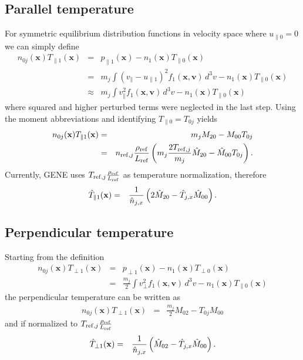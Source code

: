 \subsection{Parallel temperature}
For symmetric equilibrium distribution functions in velocity space where
$u_{\| 0} = 0$ we can simply define
\begin{eqnarray*}
n_{0j}(\mathbf{x}) T_{\| 1} (\mathbf{x}) &=& p_{\| 1}(\mathbf{x})
 -n_1(\mathbf{x})T_{\| 0}(\mathbf{x})\\
&=& m_j \int \left(v_\|-u_{\| 1}\right)^2 f_1(\mathbf{x},\mathbf{v})\,d^3v 
 -n_1(\mathbf{x})T_{\| 0}(\mathbf{x})\\
&\approx& m_j \int v_\|^2 f_1(\mathbf{x},\mathbf{v})\,d^3v 
 -n_1(\mathbf{x})T_{\| 0}(\mathbf{x})
\end{eqnarray*}
where squared and higher perturbed terms were neglected in the last step.
Using the moment abbreviations and identifying $T_{\| 0}=T_{0j}$ yields
\begin{eqnarray*}
n_{0j}(\mathbf{x}) T_{\| 1} (\mathbf{x}) &=& m_j M_{20} - M_{00}T_{0j}\\
&=& n_{\mathrm{ref},j} \frac{\rho_{\mathrm{ref}}}{L_{\mathrm{ref}}} \left(m_j \frac{2T_{\mathrm{ref},j}}{m_j} \hat{M}_{20}
    - \hat{M}_{00}T_{0j}\right).
\end{eqnarray*}
Currently, {\sc GENE} uses $T_{\mathrm{ref},j}\frac{\rho_{\mathrm{ref}}}{L_{\mathrm{ref}}}$ as temperature
normalization, therefore 
\begin{eqnarray*}
\hat{T}_{\| 1} (\mathbf{x}) &=& 
\frac{1}{\hat{n}_{j,x}} \left(2\hat{M}_{20}- \hat{T}_{j,x}\hat{M}_{00}\right).
\end{eqnarray*}

\subsection{Perpendicular temperature}
Starting from the definition
\begin{eqnarray*}
n_{0j}(\mathbf{x}) T_{\perp 1} (\mathbf{x}) &=& p_{\perp 1}(\mathbf{x})
 -n_1(\mathbf{x})T_{\perp 0}(\mathbf{x})\\
&=& \frac{m_j}{2} \int v_{\perp}^2 f_1(\mathbf{x},\mathbf{v})\,d^3v 
 -n_1(\mathbf{x})T_{\| 0}(\mathbf{x})
\end{eqnarray*}
the perpendicular temperature can be written as
\begin{eqnarray*}
n_{0j}(\mathbf{x}) T_{\perp 1} (\mathbf{x}) &=& \frac{m_j}{2} M_{02}-T_{0j} M_{00}
\end{eqnarray*}
and if normalized to $T_{\mathrm{ref},j}\frac{\rho_{\mathrm{ref}}}{L_{\mathrm{ref}}}$
\begin{eqnarray*}
\hat{T}_{\perp 1} (\mathbf{x}) &=& \frac{1}{\hat{n}_{j,x}} \left(\hat{M}_{02}-\hat{T}_{j,x}\hat{M}_{00}\right).
\end{eqnarray*}

